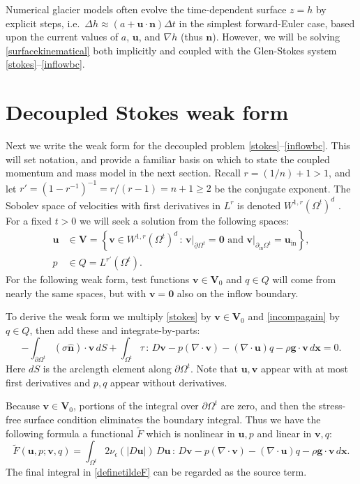 \documentclass[letterpaper,final,12pt,reqno]{amsart}
\newcommand{\eps}{\epsilon}
\newcommand{\grad}{\nabla}
\newcommand{\hbn}{\hat{\mathbf{n}}}
\newcommand{\bn}{\mathbf{n}}
\newcommand{\bu}{\mathbf{u}}
\newcommand{\bv}{\mathbf{v}}
\newcommand{\bx}{\mathbf{x}}
\newcommand{\bV}{\mathbf{V}}
\newcommand{\bzero}{\bm{0}}
\begin{document}
Numerical glacier models often evolve the time-dependent surface $z=h$ by explicit steps, i.e.~$\Delta h \approx \left(a + \bu\cdot \bn\right) \Delta t$ in the simplest forward-Euler case, based upon the current values of $a$, $\bu$, and $\grad h$ (thus $\bn$).  However, we will be solving \eqref{surfacekinematical} both implicitly and coupled with the Glen-Stokes system \eqref{stokes}--\eqref{inflowbc}.


\section{Decoupled Stokes weak form} \label{sec:weakstokes}

Next we write the weak form for the decoupled problem \eqref{stokes}--\eqref{inflowbc}.  This will set notation, and provide a familiar basis \cite[for example]{Bueler2021,Elmanetal2014} on which to state the coupled momentum and mass model in the next section.  Recall $r=(1/n) + 1>1$, and let $r'=(1-r^{-1})^{-1}=r/(r-1)=n+1\ge 2$ be the conjugate exponent.  The Sobolev space of velocities with first derivatives in $L^r$ is denoted $W^{1,r}(\Omega^t)^d$ \cite{Evans2010}.  For a fixed $t>0$ we will seek a solution from the following spaces:
\begin{align*}
\bu &\in \bV = \left\{\bv \in W^{1,r}(\Omega^t)^d\,:\,\bv\big|_{\underline{\partial} \Omega^t}=\bzero \text{ and } \bv\big|_{\partial_{\text{in}} \Omega^t} = \bu_{\text{in}}\right\}, \\
p &\in Q = L^{r'}(\Omega^t).
\end{align*}
For the following weak form, test functions $\bv \in \bV_0$ and $q\in Q$ will come from nearly the same spaces, but with $\bv=\bzero$ also on the inflow boundary.

To derive the weak form we multiply \eqref{stokes} by $\bv\in \bV_0$ and \eqref{incompagain} by $q\in Q$, then add these and integrate-by-parts:
\begin{equation}
-\int_{\partial\Omega^t} (\sigma \hbn)\cdot \bv\,dS + \int_{\Omega^t} \tau \,:\,D\bv - p (\nabla \cdot \bv) - \left(\nabla \cdot \bu\right) q - \rho \mathbf{g} \cdot \bv \,d\bx = 0. \label{nonfunctwo}
\end{equation}
Here $dS$ is the arclength element along $\partial\Omega^t$.  Note that $\bu,\bv$ appear with at most first derivatives and $p,q$ appear without derivatives.

Because $\bv\in \bV_0$, portions of the integral over $\partial\Omega^t$ are zero, and then the stress-free surface condition eliminates the boundary integral.  Thus we have the following formula a functional $\tilde F$ which is nonlinear in $\bu,p$ and linear in $\bv,q$:
\begin{equation}
\tilde F(\bu,p;\bv,q) = \int_{\Omega^t} 2 \nu_\eps(|D\bu|)\, D\bu\,:\,D\bv - p (\nabla \cdot \bv) - \left(\nabla \cdot \bu\right) q - \rho \mathbf{g} \cdot \bv \,d\bx. \label{definetildeF}
\end{equation}
The final integral in \eqref{definetildeF} can be regarded as the source term.
\end{document}
